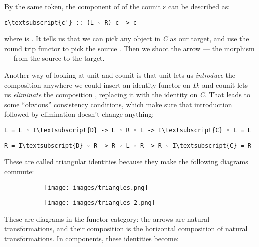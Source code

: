\begin{figure}[H]
\centering
{}
\end{figure}

\noindent
By the same token, the component of of the counit ε can be described as:

\begin{Verbatim}[commandchars=\\\{\}]
ε\textsubscript{c'} :: (L ◦ R) c -> c
\end{Verbatim}
where  is . It tells us that we
can pick any object  in \emph{C} as our target, and use the
round trip functor  to pick the source
. Then we shoot the arrow --- the morphism
 --- from the source to the target.

Another way of looking at unit and counit is that unit lets us
\emph{introduce} the composition  anywhere we could
insert an identity functor on \emph{D}; and counit lets us
\emph{eliminate} the composition , replacing it with the
identity on \emph{C}. That leads to some ``obvious'' consistency
conditions, which make sure that introduction followed by elimination
doesn't change anything:

\begin{Verbatim}[commandchars=\\\{\}]
L = L ◦ I\textsubscript{D} -> L ◦ R ◦ L -> I\textsubscript{C} ◦ L = L
\end{Verbatim}

\begin{Verbatim}[commandchars=\\\{\}]
R = I\textsubscript{D} ◦ R -> R ◦ L ◦ R -> R ◦ I\textsubscript{C} = R
\end{Verbatim}
These are called triangular identities because they make the following
diagrams commute:

\begin{figure}[H]
  \centering

  \begin{subfigure}
    \centering
    \texttt{[image: images/triangles.png]}
  \end{subfigure}%
  \begin{subfigure}
    \centering
    \texttt{[image: images/triangles-2.png]}
  \end{subfigure}
\end{figure}

\noindent
These are diagrams in the functor category: the arrows are natural
transformations, and their composition is the horizontal composition of
natural transformations. In components, these identities become:

